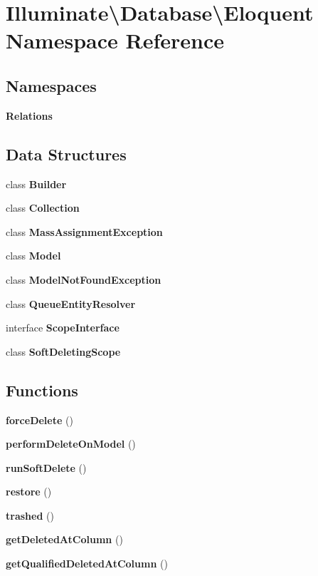 \section{Illuminate\textbackslash{}Database\textbackslash{}Eloquent Namespace Reference}
\label{namespace_illuminate_1_1_database_1_1_eloquent}
\subsection*{Namespaces}
\begin{DoxyCompactItemize}
\item 
 {\bf Relations}
\end{DoxyCompactItemize}
\subsection*{Data Structures}
\begin{DoxyCompactItemize}
\item 
class {\bf Builder}
\item 
class {\bf Collection}
\item 
class {\bf Mass\+Assignment\+Exception}
\item 
class {\bf Model}
\item 
class {\bf Model\+Not\+Found\+Exception}
\item 
class {\bf Queue\+Entity\+Resolver}
\item 
interface {\bf Scope\+Interface}
\item 
class {\bf Soft\+Deleting\+Scope}
\end{DoxyCompactItemize}
\subsection*{Functions}
\begin{DoxyCompactItemize}
\item 
{\bf force\+Delete} ()
\item 
{\bf perform\+Delete\+On\+Model} ()
\item 
{\bf run\+Soft\+Delete} ()
\item 
{\bf restore} ()
\item 
{\bf trashed} ()
\item 
{\bf get\+Deleted\+At\+Column} ()
\item 
{\bf get\+Qualified\+Deleted\+At\+Column} ()
\end{DoxyCompactItemize}
